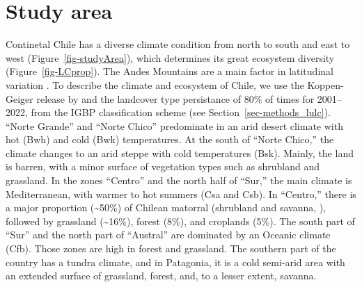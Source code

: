 \documentclass[
  authoryear,
  preprint,
  3p,
  onecolumn]{elsarticle}
\begin{document}
\hypertarget{study-area}{%
\section{Study area}\label{study-area}}

Continetal Chile has a diverse climate condition from north to south and
east to west \citep{Aceituno2021} (Figure~\ref{fig-studyArea}), which
determines its great ecosystem diversity (Figure~\ref{fig-LCprop}). The
Andes Mountains are a main factor in latitudinal variation
\citep{Garreaud2009}. To describe the climate and ecosystem of Chile, we
use the Koppen-Geiger release by \citet{Beck2023} and the landcover type
persistance of 80\% of times for 2001--2022, from the IGBP
classification scheme \citep{Friedl2019} (see
Section~\ref{sec-methods_lulc}). ``Norte Grande'' and ``Norte Chico''
predominate in an arid desert climate with hot (Bwh) and cold (Bwk)
temperatures. At the south of ``Norte Chico,'' the climate changes to an
arid steppe with cold temperatures (Bsk). Mainly, the land is barren,
with a minor surface of vegetation types such as shrubland and
grassland. In the zones ``Centro'' and the north half of ``Sur,'' the
main climate is Mediterranean, with warmer to hot summers (Csa and Csb).
In ``Centro,'' there is a major proportion (\textasciitilde50\%) of
Chilean matorral (shrubland and savanna, \citep{Fuentes2021}), followed
by grassland (\textasciitilde16\%), forest (8\%), and croplands (5\%).
The south part of ``Sur'' and the north part of ``Austral'' are
dominated by an Oceanic climate (Cfb). Those zones are high in forest
and grassland. The southern part of the country has a tundra climate,
and in Patagonia, it is a cold semi-arid area with an extended surface
of grassland, forest, and, to a lesser extent, savanna.
\end{document}
